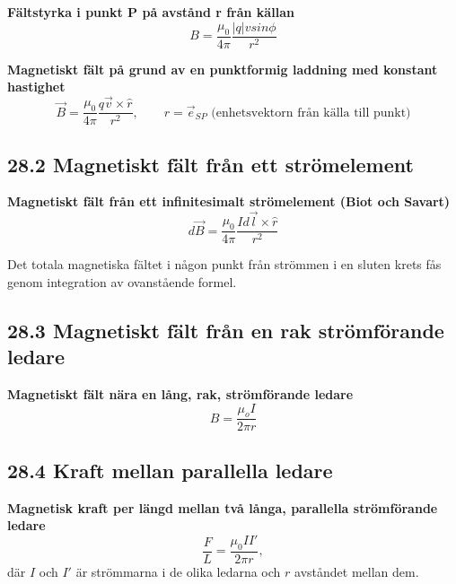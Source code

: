 \documentclass[a4paper]{article}
\begin{document}
\textbf{Fältstyrka i punkt P på avstånd r från källan}
\begin{equation}
B = \dfrac{\mu_0}{4 \pi} \dfrac{|q|vsin\phi}{r^2}
\end{equation}

\textbf{Magnetiskt fält på grund av en punktformig laddning med konstant hastighet}
\begin{equation}
\vec{B} = \dfrac{\mu_0}{4\pi} \dfrac{q \vec{v} \times \hat{r}}{r^2}, \qquad \text{$\hat{r} = \vec{e}_{SP}$ (enhetsvektorn från källa till punkt)}
\end{equation}

\subsection*{28.2 Magnetiskt fält från ett strömelement}
\textbf{Magnetiskt fält från ett infinitesimalt strömelement (Biot och Savart)}
\begin{equation}
d \vec{B} = \dfrac{\mu_0}{4\pi} \dfrac{Id \vec{l} \times \hat{r}}{r^2}
\end{equation}

Det totala magnetiska fältet i någon punkt från strömmen i en sluten krets fås genom integration av ovanstående formel.

\subsection*{28.3 Magnetiskt fält från en rak strömförande ledare}
\textbf{Magnetiskt fält nära en lång, rak, strömförande ledare}
\begin{equation}
B = \dfrac{\mu_o I}{2 \pi r}
\end{equation}

\subsection*{28.4 Kraft mellan parallella ledare}
\textbf{Magnetisk kraft per längd mellan två långa, parallella strömförande ledare}
\begin{equation}
\dfrac{F}{L} = \dfrac{\mu_0 I I'}{2 \pi r},
\end{equation}
där $I$ och $I'$ är strömmarna i de olika ledarna och $r$ avståndet mellan dem.
\end{document}
